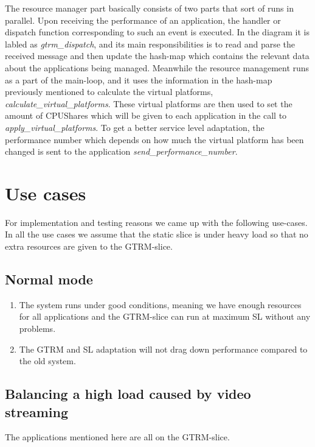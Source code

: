 \documentclass[nobiblatex]{LTHthesis}
\begin{document}
The resource manager part basically consists of two parts that sort of runs in parallel. Upon receiving the performance of an application, the handler or dispatch function corresponding to such an event is executed. In the diagram it is labled as \emph{gtrm\_dispatch}, and its main responsibilities is to read and parse the received message and then update the hash-map which contains the relevant data about the applications being managed. Meanwhile the resource management runs as a part of the main-loop, and it uses the information in the hash-map previously mentioned to calculate the virtual platforms, \emph{calculate\_virtual\_platforms}. These virtual platforms are then used to set the amount of CPUShares which will be given to each application in the call to \emph{apply\_virtual\_platforms}. To get a better service level adaptation, the performance number which depends on how much the virtual platform has been changed is sent to the application \emph{send\_performance\_number}.



\chapter{Use cases}
\label{chp:usecases}

For implementation and testing reasons we came up with the following use-cases. In all the use cases we assume that the static slice is under heavy load so that no extra resources are given to the GTRM-slice. 
\section{Normal mode}
\begin{enumerate}
\item The system runs under good conditions, meaning we have enough resources for all applications and the GTRM-slice can run at maximum SL without any problems.
\item The GTRM and SL adaptation will not drag down performance compared to the old system.
\end{enumerate}
\section{Balancing a high load caused by video streaming}
The applications mentioned here are all on the GTRM-slice.
\end{document}
